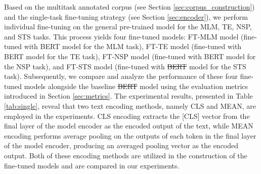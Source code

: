 \documentclass[mathematics,article,submit,moreauthors]{Definitions/mdpi}
\newcommand{\1}[1]{\mathds{1}\left[#1\right]}
\newcommand{\secref}[1]{Section \ref{#1}}
\newcommand{\tableref}[1]{Table \ref{#1}}
\providecommand{\DIFadd}[1]{{\protect\color{blue}\uwave{#1}}} %
\providecommand{\DIFdel}[1]{{\protect\color{red}\sout{#1}}}                      %
\providecommand{\DIFaddbegin}{} %
\providecommand{\DIFaddend}{} %
\providecommand{\DIFdelbegin}{} %
\providecommand{\DIFdelend}{} %
\begin{document}
Based on the multitask annotated corpus (see \secref{sec:corpus_construction}) and the single-task fine-tuning strategy (see \secref{sec:encoder}), we perform individual fine-tuning on the general pre-trained model for the MLM, TE, NSP, and STS tasks. This process yields four fine-tuned models: FT-MLM model (fine-tuned with BERT model for the MLM task), FT-TE model (fine-tuned with BERT model for the TE task), FT-NSP model (fine-tuned with BERT model for the NSP task), and FT-STS model (fine-tuned with \DIFdelbegin \DIFdel{BERT }\DIFdelend \DIFaddbegin \DIFadd{pre-trained }\DIFaddend model for the STS task). Subsequently, we compare and analyze the performance of these four fine-tuned models alongside the baseline \DIFdelbegin \DIFdel{BERT }\DIFdelend \DIFaddbegin \DIFadd{$\text{BERT}_{base}$ }\DIFaddend model using the evaluation metrics introduced in \secref{sec:metrics}. The experimental results, presented in \tableref{tab:single}, reveal that two text encoding methods, namely CLS and MEAN, are employed in the experiments. CLS encoding extracts the [CLS] vector from the final layer of the model encoder as the encoded output of the text, while MEAN encoding performs average pooling on the outputs of each token in the final layer of the model encoder, producing an averaged pooling vector as the encoded output. Both of these encoding methods are utilized in the construction of the fine-tuned models and are compared in our experiments.
\end{document}
